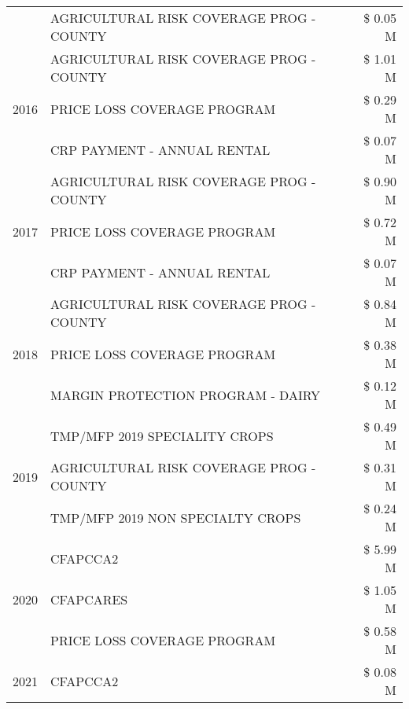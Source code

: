 \begin{tabular}{llr}
 & AGRICULTURAL RISK COVERAGE PROG - COUNTY & \$ 0.05 M \\
\cline{1-3}
\multirow[t]{3}{*}{2016} & AGRICULTURAL RISK COVERAGE PROG - COUNTY & \$ 1.01 M \\
 & PRICE LOSS COVERAGE PROGRAM & \$ 0.29 M \\
 & CRP PAYMENT - ANNUAL RENTAL & \$ 0.07 M \\
\cline{1-3}
\multirow[t]{3}{*}{2017} & AGRICULTURAL RISK COVERAGE PROG - COUNTY & \$ 0.90 M \\
 & PRICE LOSS COVERAGE PROGRAM & \$ 0.72 M \\
 & CRP PAYMENT - ANNUAL RENTAL & \$ 0.07 M \\
\cline{1-3}
\multirow[t]{3}{*}{2018} & AGRICULTURAL RISK COVERAGE PROG - COUNTY & \$ 0.84 M \\
 & PRICE LOSS COVERAGE PROGRAM & \$ 0.38 M \\
 & MARGIN PROTECTION PROGRAM - DAIRY & \$ 0.12 M \\
\cline{1-3}
\multirow[t]{3}{*}{2019} & TMP/MFP 2019 SPECIALITY CROPS & \$ 0.49 M \\
 & AGRICULTURAL RISK COVERAGE PROG - COUNTY & \$ 0.31 M \\
 & TMP/MFP 2019 NON SPECIALTY CROPS & \$ 0.24 M \\
\cline{1-3}
\multirow[t]{3}{*}{2020} & CFAPCCA2 & \$ 5.99 M \\
 & CFAPCARES & \$ 1.05 M \\
 & PRICE LOSS COVERAGE PROGRAM & \$ 0.58 M \\
\cline{1-3}
2021 & CFAPCCA2 & \$ 0.08 M \\
\cline{1-3}
\bottomrule
\end{tabular}

